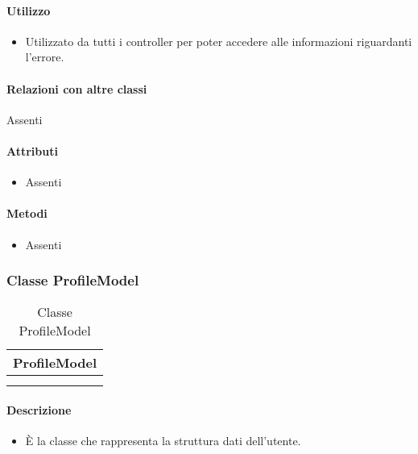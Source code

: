 \paragraph*{Utilizzo}
\begin{itemize}
\item[] Utilizzato da tutti i controller per poter accedere alle informazioni riguardanti l'errore.
\end{itemize}

\paragraph*{Relazioni con altre classi}
Assenti

\paragraph*{Attributi}
\begin{itemize}
\item[] Assenti
\end{itemize}

\paragraph*{Metodi}
\begin{itemize}
\item[] Assenti
\end{itemize}

\subsubsection{Classe ProfileModel}

\begin{table}[ht]
\begin{center}
\bgroup
\setlength{\arrayrulewidth}{0.6mm}
\def\arraystretch{1}
\begin{tabular}{ | p{12cm} | }
\hline
\centerline{\textbf{ProfileModel}}
\\ \hline
 \\ 
\hline
 \\ 
\hline
\end{tabular}
\egroup
\caption{Classe ProfileModel}
\end{center}
\end{table}

\paragraph*{Descrizione}
\begin{itemize}
\item[] È la classe che rappresenta la struttura dati dell'utente.
\end{itemize}

